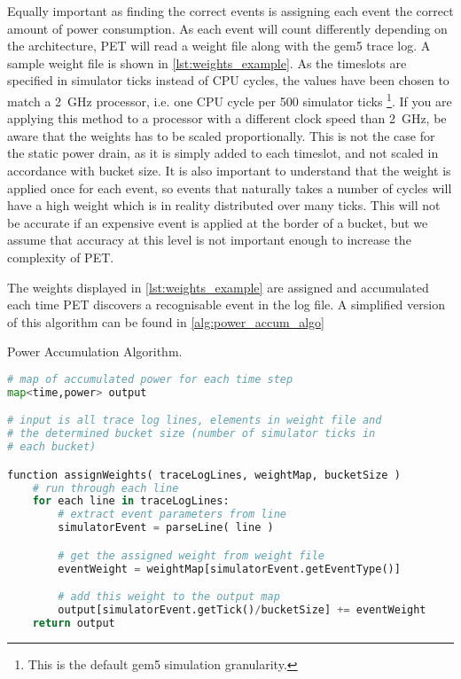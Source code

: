 Equally important as finding the correct events is assigning each event the
correct amount of power consumption. As each event will count differently
depending on the architecture, PET will read a weight file along with the gem5
trace log. A sample weight file is shown in \autoref{lst:weights_example}. As
the timeslots are specified in simulator ticks instead of CPU cycles, the values
have been chosen to match a 2~GHz processor, i.e. one CPU cycle per 500
simulator ticks \footnote{This is the default gem5 simulation granularity.}.
If you are applying this method to a processor with a different clock speed than
2~GHz, be aware that the weights has to be scaled proportionally. This is not
the case for the static power drain, as it is simply added to each timeslot, and
not scaled in accordance with bucket size. It is also important to understand
that the weight is applied once for each event, so events that naturally takes a
number of cycles will have a high weight which is in reality distributed over
many ticks. This will not be accurate if an expensive event is applied at the
border of a bucket, but we assume that accuracy at this level is not important
enough to increase the complexity of PET.



The weights displayed in \autoref{lst:weights_example} are assigned and
accumulated each time PET discovers a recognisable event in the log file. A
simplified version of this algorithm can be found in
\autoref{alg:power_accum_algo}

\begin{algorithm}
\caption{Power Accumulation Algorithm.}
\label{alg:power_accum_algo}
\begin{lstlisting}[language=Python,style=algo]
# map of accumulated power for each time step
map<time,power> output

# input is all trace log lines, elements in weight file and
# the determined bucket size (number of simulator ticks in
# each bucket)

function assignWeights( traceLogLines, weightMap, bucketSize )
    # run through each line
    for each line in traceLogLines:
        # extract event parameters from line
        simulatorEvent = parseLine( line )

        # get the assigned weight from weight file
        eventWeight = weightMap[simulatorEvent.getEventType()]

        # add this weight to the output map
        output[simulatorEvent.getTick()/bucketSize] += eventWeight
    return output
\end{lstlisting}
\end{algorithm}

